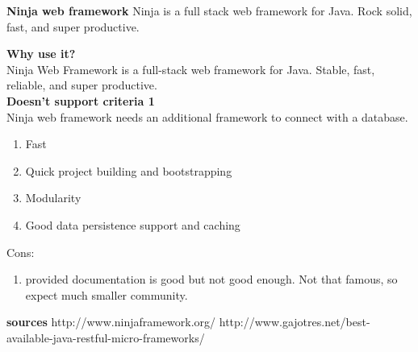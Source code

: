 \textbf{Ninja web framework}
Ninja is a full stack web framework for Java.
Rock solid, fast, and super productive.

\textbf{Why use it?} \\
Ninja Web Framework is a full-stack web framework for Java. Stable, fast, reliable, and super productive. \\

\textbf{Doesn't support criteria 1}\\
Ninja web framework needs an additional framework  to connect with a database.

\begin{enumerate}
	\item Fast
	\item Quick project building and bootstrapping
	\item Modularity
	\item Good data persistence support and caching
\end{enumerate}
Cons:
\begin{enumerate}
	\item provided documentation is good but not good enough.
	\itemA Not that famous, so expect much smaller community.
\end{enumerate}

\textbf{sources}
http://www.ninjaframework.org/
http://www.gajotres.net/best-available-java-restful-micro-frameworks/